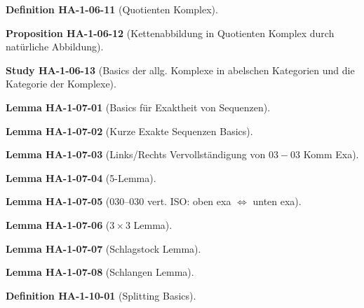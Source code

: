 \documentclass[10pt, letterpaper]{article}
\newcommand{\CustomHeading}[3]{%
  \par\medskip\noindent%
  \textbf{#1 #2} \textnormal{(#3)}.\enskip%
}
\newenvironment{DEF}[2]{\CustomHeading{Definition}{#1}{#2}}{}
\newenvironment{PROP}[2]{\CustomHeading{Proposition}{#1}{#2}}{}
\newenvironment{LEM}[2]{\CustomHeading{Lemma}{#1}{#2}}{}
\newenvironment{STUD}[2]{\CustomHeading{Study}{#1}{#2}}{}
\begin{document}
\begin{DEF}{HA-1-06-11}{Quotienten Komplex}
\end{DEF}

\begin{PROP}{HA-1-06-12}{Kettenabbildung in Quotienten Komplex durch natürliche Abbildung}
\end{PROP}

\begin{STUD}{HA-1-06-13}{Basics der allg. Komplexe in abelschen Kategorien und die Kategorie der Komplexe}
\end{STUD}

\begin{LEM}{HA-1-07-01}{Basics für Exaktheit von Sequenzen}
\end{LEM}

\begin{LEM}{HA-1-07-02}{Kurze Exakte Sequenzen Basics}
\end{LEM}

\begin{LEM}{HA-1-07-03}{Links/Rechts Vervollständigung von $03-03$ Komm Exa}
\end{LEM}

\begin{LEM}{HA-1-07-04}{5-Lemma}
\end{LEM}

\begin{LEM}{HA-1-07-05}{$030$–$030$ vert. ISO: oben exa $\Leftrightarrow$ unten exa}
\end{LEM}

\begin{LEM}{HA-1-07-06}{$3\times 3$ Lemma}
\end{LEM}

\begin{LEM}{HA-1-07-07}{Schlagstock Lemma}
\end{LEM}

\begin{LEM}{HA-1-07-08}{Schlangen Lemma}
\end{LEM}

\begin{DEF}{HA-1-10-01}{Splitting Basics}
\end{DEF}
\end{document}
